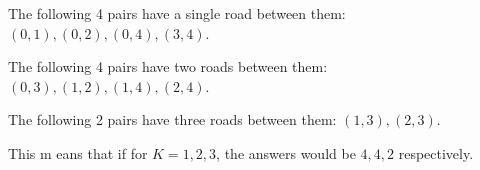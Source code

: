 The following 4 pairs have a single road between them: $(0, 1), (0, 2), (0, 4), (3, 4)$.

The following 4 pairs have two roads between them: $(0, 3), (1, 2), (1, 4), (2, 4)$.

The following 2 pairs have three roads between them: $(1, 3), (2, 3)$.

This m
eans that if for $K = 1, 2, 3$, the answers would be $4, 4, 2$ respectively.
